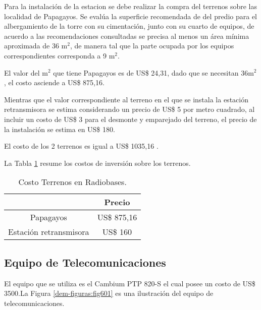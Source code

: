 Para la instalación de la estacion se debe realizar la compra del terrenos sobre las localidad de Papagayos. Se evalúa la superficie recomendada de del predio para el albergamiento de la torre con su cimentación, junto con su cuarto de equipos, de acuerdo a las recomendaciones consultadas se precisa al menos un área mínima aproximada de 36 m$^{2}$, de manera tal que la parte ocupada por los equipos correspondientes corresponda a 9 m$^{2}$\cite{recomendacion}.

El valor del m$^{2}$ que tiene Papagayos es de US\$  24,31, dado que se necesitan 36m$^{2}$, el costo asciende a US\$  875,16.


Mientras que el valor correspondiente al terreno en el que se instala la estación retransmisora se estima considerando un precio de US\$  5 por metro cuadrado, al incluir un costo de US\$  3 \cite{terreno3} para el desmonte y emparejado del terreno, el precio de la instalación se estima en US\$  180.

El costo de los 2 terrenos es igual a US\$  1035,16 \cite{terreno1}\cite{terreno3}.


La Tabla \ref{tab:terrenos} resume los costos de inversión sobre los terrenos.

\begin{table}[H]
  \centering  
    \begin{tabular}{|c|c|}
    \hline
    \rowcolor[HTML]{C5D9F1}{\textbf{Ubicación}} & {\textbf{Precio}} \bigstrut\\
    \hline
    Papagayos & US\$  875,16 \bigstrut\\
    \hline
    Estación retransmisora & US\$  160 \bigstrut\\
    \hline
    \end{tabular}%
    \caption{Costo Terrenos en Radiobases.}
  \label{tab:terrenos}%
\end{table}%




\subsection{Equipo de Telecomunicaciones}

El equipo que se utiliza es el Cambium PTP 820-S el cual posee un costo de US\$ 3500.La Figura \ref{dem-figuras:fig601} es una ilustración del equipo de telecomunicaciones. 


